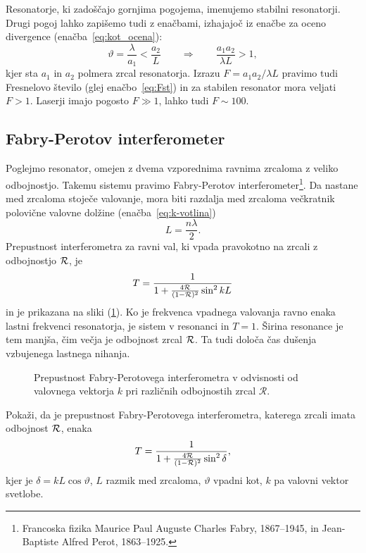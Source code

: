Resonatorje, ki zadoščajo gornjima pogojema, imenujemo stabilni 
resonatorji.
Drugi pogoj lahko zapišemo tudi z enačbami, izhajajoč iz enačbe za oceno divergence (enačba~\ref{eq:kot_ocena}):
\begin{equation}
\vartheta = \frac{\lambda}{a_1} < \frac{a_2}{L} \qquad \Rightarrow \qquad
\frac{a_{1}a_{2}}{\lambda L}>1,
\label{eq:Fresnelovo_stevilo}
\end{equation}
kjer sta $a_{1}$ in $a_{2}$ polmera zrcal resonatorja. Izrazu 
$
F = a_{1}a_{2}/\lambda L
$
pravimo tudi Fresnelovo število (glej enačbo~\ref{eq:Fst})
in za stabilen resonator mora veljati $F>1$. Laserji imajo pogosto $F\gg 1$, lahko tudi $F \sim 100$.

\subsection*{Fabry-Perotov interferometer}
Poglejmo resonator, omejen z dvema vzporednima ravnima zrcaloma
z veliko odbojnostjo. Takemu sistemu pravimo Fabry-Perotov 
interferometer\footnote{Francoska fizika Maurice Paul Auguste Charles Fabry, 1867--1945, in 
Jean-Baptiste Alfred Perot, 1863--1925.}. 
Da nastane med zrcaloma stoječe valovanje, mora biti razdalja 
med zrcaloma večkratnik polovične valovne dolžine (enačba~\ref{eq:k-votlina})
\begin{equation}
L = \frac{n \lambda}{2}.
\end{equation}
Prepustnost interferometra za ravni val, ki vpada pravokotno na zrcali z
odbojnostjo ${\cal R}$, je 
\begin{equation}
T=\frac{1}{1+\frac{4{\cal R}}{(1-{\cal R})^{2}}\sin^{2}kL}
\label{eq:Fabry-Perot-prepustnost}
\end{equation}
in je prikazana na sliki (\ref{fig:Fabry-Perot}).
Ko je frekvenca vpadnega valovanja ravno enaka lastni frekvenci
resonatorja, je sistem v resonanci in  $T=1$. Širina resonance je tem manjša, čim
večja je odbojnost zrcal ${\cal R}$. Ta tudi določa čas dušenja vzbujenega
lastnega nihanja.
\begin{figure}[h!]
\centering
\def\svgwidth{95truemm} 

\caption{
Prepustnost Fabry-Perotovega interferometra
v odvisnosti od valovnega vektorja $k$ pri različnih odbojnostih zrcal
$\mathcal{R}.$}
\label{fig:Fabry-Perot}
\end{figure}

\begin{definition}
Pokaži, da je prepustnost Fabry-Perotovega interferometra, katerega zrcali imata odbojnost $\cal{R}$, enaka 
\begin{equation}
T = \frac{1}{1+\frac{4\cal{R}}{(1-{\cal R})^2}\sin^2 \delta},
\label{eq:FP}
\end{equation}
kjer je $\delta = kL\cos{\vartheta}$, $L$ razmik med zrcaloma, $\vartheta$ vpadni kot, 
$k$ pa valovni vektor svetlobe.
\end{definition}

